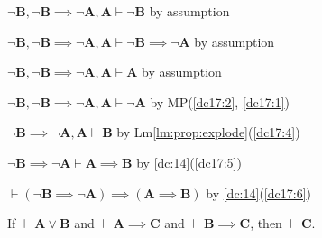 \documentclass{amsart}%
\newcommand\metavariable[1]{\boldsymbol{#1}}
\begin{document}
\begin{pf}
\item\label{dc17:1} $\neg\metavariable{B},\neg\metavariable{B}\implies\neg\metavariable{A},\metavariable{A}\vdash\neg\metavariable{B}$
by assumption
\item\label{dc17:2} $\neg\metavariable{B},\neg\metavariable{B}\implies\neg\metavariable{A},\metavariable{A}\vdash\neg\metavariable{B}\implies\neg\metavariable{A}$
by assumption
\item\label{dc17:3} $\neg\metavariable{B},\neg\metavariable{B}\implies\neg\metavariable{A},\metavariable{A}\vdash\metavariable{A}$
by assumption
\item\label{dc17:4} $\neg\metavariable{B},\neg\metavariable{B}\implies\neg\metavariable{A},\metavariable{A}\vdash\neg\metavariable{A}$ by MP(\ref{dc17:2}, \ref{dc17:1})
\item\label{dc17:5} $\neg\metavariable{B}\implies\neg\metavariable{A},\metavariable{A}\vdash\metavariable{B}$ by Lm\ref{lm:prop:explode}(\ref{dc17:4})
\item\label{dc17:6} $\neg\metavariable{B}\implies\neg\metavariable{A}\vdash\metavariable{A}\implies\metavariable{B}$ by \ref{dc:14}(\ref{dc17:5})
\item\label{dc17:7} $\vdash(\neg\metavariable{B}\implies\neg\metavariable{A})\implies(\metavariable{A}\implies\metavariable{B})$ by \ref{dc:14}(\ref{dc17:6})
\end{pf}

\begin{dc}\label{dc:18}
If $\vdash\metavariable{A}\lor\metavariable{B}$
and $\vdash\metavariable{A}\implies\metavariable{C}$
and $\vdash\metavariable{B}\implies\metavariable{C}$,
then $\vdash\metavariable{C}$.
\end{dc}
\end{document}

